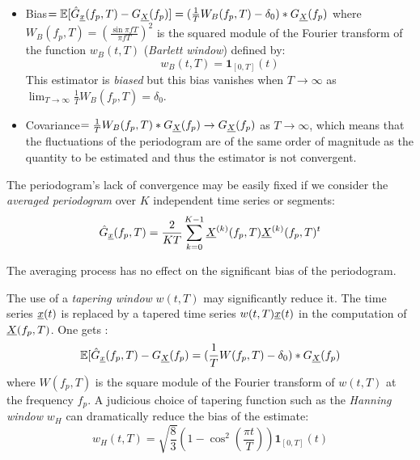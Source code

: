 \begin{itemize}
\item Bias$=\mathbb{E}[\hat{G}_{{\underline{x}}}(f_p, T)-G_{{\underline{X}}}(f_p)]=(\frac{1}{T}W_B(f_p, T)-\delta_0)*G_{{\underline{X}}}(f_p)$ where $W_B(f_p, T) = \left(\frac{\sin\pi fT}{\pi fT}\right)^2$ is the squared module of the Fourier transform of the function $w_B(t, T)$ (\emph{Barlett window}) defined by:
  \begin{equation}
    w_B(t, T) = \mathbf{1}_{[0,T]}(t)
  \end{equation}
 This estimator is \emph{biased} but this bias vanishes when $T\rightarrow\infty$ as $\lim_{T\rightarrow\infty} \frac{1}{T}W_B(f_p, T)=\delta_0$.
\item Covariance$=\frac{1}{T}W_B(f_p, T)*G_{{\underline{X}}}(f_p)\rightarrow G_{{\underline{X}}}(f_p)$ as $T\rightarrow\infty$, 
which means that the fluctuations of the periodogram are of the same order of magnitude as the quantity to be estimated and thus the estimator is not convergent. 
\end{itemize}

The periodogram's lack of convergence may be easily fixed if we  consider the \emph{averaged periodogram} over $K$ independent time series or segments:
\begin{equation}
  \hat{G}_{{\underline{x}}}(f_p,T)=\frac{2}{KT}\sum_{k=0}^{K-1}{\underline{X}}^{(k)}(f_p,T){\underline{X}}^{(k)}(f_p,T)^t
\end{equation}

The averaging process has no effect on the significant bias of the periodogram.
 
The use of a \emph{tapering window} $w(t, T)$ may significantly reduce it. The time series ${\underline{x}}(t)$ is replaced by a tapered time series $w(t, T){\underline{x}}(t)$ in the 
computation of ${\underline{X}}(f_p,T)$. One gets :
\begin{equation}
  \mathbb{E}[\hat{G}_{{\underline{x}}}(f_p, T)-G_{{\underline{X}}}(f_p)=(\frac{1}{T}W(f_p, T)-\delta_0)*G_{{\underline{X}}}(f_p)
\end{equation}
where $W(f_p, T)$ is the square module of the Fourier transform of $w(t, T)$ at the frequency $f_p$. 
A judicious choice of tapering function such as the \emph{Hanning window} $w_H$ can dramatically reduce the bias of the estimate:
\begin{equation}\label{HamEff}
  w_H(t, T) = \sqrt{\frac{8}{3}}\left(1-\cos^2\left(\frac{\pi t}{T}\right)\right)\mathbf{1}_{[0,T]}(t)
\end{equation}

